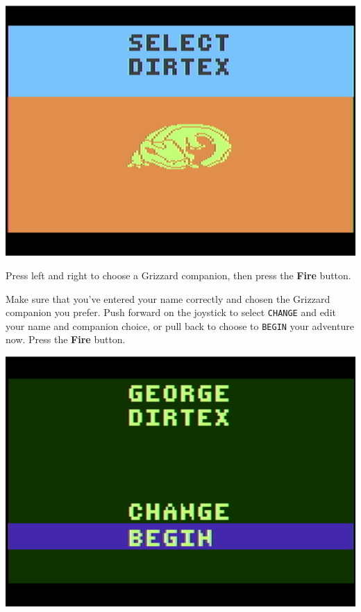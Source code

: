 \documentclass[10pt,twocolumn,openany,article]{memoir}
\begin{document}
\begin{center}
  \includegraphics[width=\columnwidth]{../Manual/GrizzardChooserNTSC.png}
\end{center}

Press left  and right  to choose  a Grizzard  companion, then  press the
\textbf{Fire} button.

Make  sure  that you've  entered  your  name  correctly and  chosen  the
Grizzard companion  you prefer. Push  forward on the joystick  to select
\texttt{CHANGE} and edit your name and companion choice, or pull back to
choose    to   \texttt{BEGIN}    your   adventure    now.   Press    the
\textbf{Fire} button.

\begin{center}
  \includegraphics[width=\columnwidth]{../Manual/ConfirmNewGameNTSC.png}
\end{center}
\end{document}
